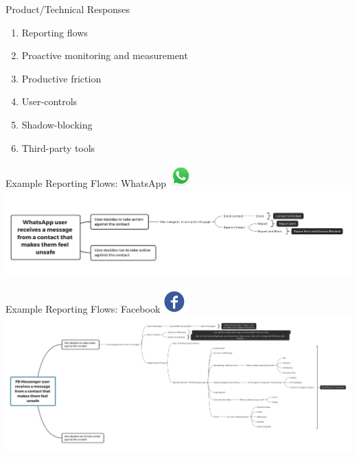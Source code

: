 \documentclass[nobackground,dvipsnames,table,aspectratio=169]{beamer}
\begin{document}
\begin{frame}{Product/Technical Responses}
    \begin{enumerate}
        \item Reporting flows
        \item Proactive monitoring and measurement
        \item Productive friction
        \item User-controls
        \item Shadow-blocking
        \item Third-party tools
    \end{enumerate}
\end{frame}

\begin{frame}{Example Reporting Flows: WhatsApp}
    \centering
    \includegraphics[width=25pt]{whatsapp}
    \includegraphics[width=\textwidth]{whatsapp-reporting-flow}
\end{frame}

\begin{frame}{Example Reporting Flows: Facebook}
    \centering
    \includegraphics[width=25pt]{facebook}
    \includegraphics[width=\textwidth]{facebook-reporting-flow}
\end{frame}
\end{document}
